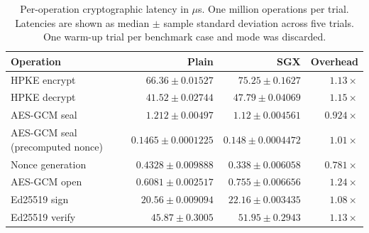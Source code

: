 \begin{table}[H]
\centering
\small
\setlength{\tabcolsep}{4pt}
\begin{tabular}{lrrr}
\toprule
Operation & Plain & SGX & Overhead \\
\midrule
HPKE encrypt & $66.36 \pm 0.01527$ & $75.25 \pm 0.1627$ & $1.13\times$ \\
HPKE decrypt & $41.52 \pm 0.02744$ & $47.79 \pm 0.04069$ & $1.15\times$ \\
AES-GCM seal & $1.212 \pm 0.00497$ & $1.12 \pm 0.004561$ & $0.924\times$ \\
\quad AES-GCM seal (precomputed nonce) & $0.1465 \pm 0.0001225$ & $0.148 \pm 0.0004472$ & $1.01\times$ \\
\quad Nonce generation & $0.4328 \pm 0.009888$ & $0.338 \pm 0.006058$ & $0.781\times$ \\
AES-GCM open & $0.6081 \pm 0.002517$ & $0.755 \pm 0.006656$ & $1.24\times$ \\
Ed25519 sign & $20.56 \pm 0.009094$ & $22.16 \pm 0.003435$ & $1.08\times$ \\
Ed25519 verify & $45.87 \pm 0.3005$ & $51.95 \pm 0.2943$ & $1.13\times$ \\
\bottomrule
\end{tabular}
\caption{Per-operation cryptographic latency in ${}\mu$s. One million operations per trial. Latencies are shown as median $\pm$ sample standard deviation across five trials. One warm-up trial per benchmark case and mode was discarded.}
\label{tab:reproduction-table4-1m}
\end{table}
